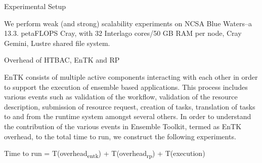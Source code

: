 Experimental Setup

We perform weak (and strong) scalability experiments on NCSA Blue Waters--a 13.3. petaFLOPS Cray, with 32 Interlago cores/50 GB RAM per node, Cray Gemini, Lustre shared file system.

Overhead of HTBAC, EnTK and RP

EnTK consists of multiple active components interacting with each other in order to support the execution of ensemble based applications. This process includes various events such as validation of the workflow, validation of the resource description, submission of resource request, creation of tasks, translation of tasks to and from the runtime system amongst several others. In order to understand the contribution of the various events in Ensemble Toolkit, termed as EnTK overhead, to the total time to run, we construct the following experiments.

Time to run = T(overhead\textsubscript{entk}) + T(overhead\textsubscript{rp}) + T(execution)
